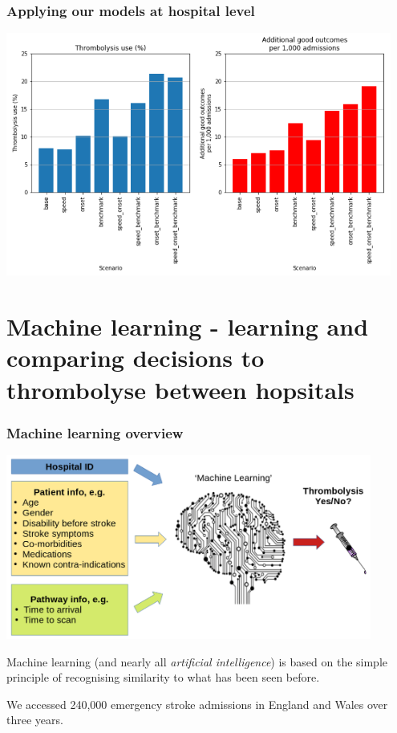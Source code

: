 \documentclass[xcolor={usenames,dvipsnames}]{beamer}
\begin{document}

\begin{frame}
\frametitle{Applying our models at hospital level}

\begin{center}
\includegraphics[width=0.95\textwidth]{./images/hosp_scenario_1}
\end{center}

\end{frame}

\section{Machine learning - learning and comparing decisions to thrombolyse between hopsitals}



\begin{frame}
\frametitle{Machine learning overview}
\begin{center}
\includegraphics[width=0.90\textwidth]{./images/ml_model_high_level}
\end{center}


Machine learning (and nearly all \emph{artificial intelligence}) is based on the simple principle of recognising similarity to what has been seen before.
\vspace{3mm}

We accessed 240,000 emergency stroke admissions in England and Wales over three years.
\end{frame}
\end{document}
